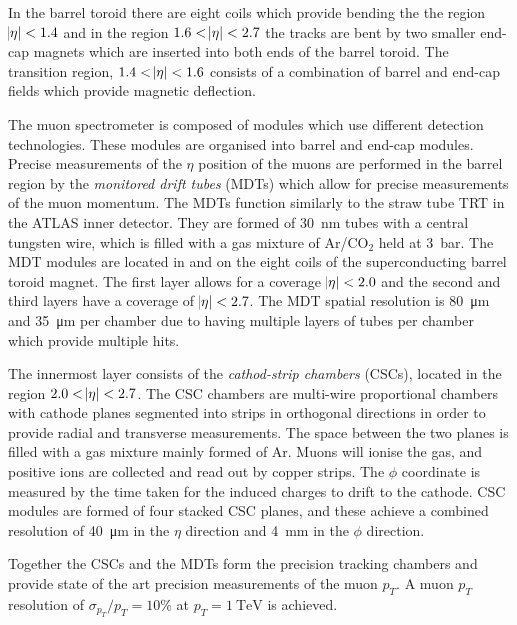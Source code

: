 In the barrel toroid there are eight coils which provide bending the the region $\abs{\eta} < 1.4$ and in the region $1.6 < \abs{\eta} < 2.7$ the tracks are bent by two smaller end-cap magnets which are inserted into both ends of the barrel toroid. The transition region, $1.4 < \abs{\eta} < 1.6$ consists of a combination of barrel and end-cap fields which provide magnetic deflection. 

The muon spectrometer is composed of modules which use different detection technologies. These modules are organised into barrel and end-cap modules. Precise measurements of the $\eta$ position of the muons are performed in the barrel region by the \emph{monitored drift tubes} (MDTs) which allow for precise measurements of the muon momentum. The MDTs function similarly to the straw tube TRT in the ATLAS inner detector. They are formed of \SI{30}{\nano\meter} tubes with a central tungsten wire, which is filled with a gas mixture of Ar/CO$_2$ held at \SI{3}{\bar}. The MDT modules are located in and on the eight coils of the superconducting barrel toroid magnet. The first layer allows for a coverage $\abs{\eta} < 2.0$ and the second and third layers have a coverage of $\abs{\eta} < 2.7$. The MDT spatial resolution is \SI{80}{\micro\meter} and \SI{35}{\micro\meter} per chamber due to having multiple layers of tubes per chamber which provide multiple hits. 

The innermost layer consists of the \emph{cathod-strip chambers} (CSCs), located in the region $2.0 < \abs{\eta} < 2.7$. The CSC chambers are multi-wire proportional chambers with cathode planes segmented into strips in orthogonal directions in order to provide radial and transverse measurements. The space between the two planes is filled with a gas mixture mainly formed of Ar. Muons will ionise the gas, and positive ions are collected and read out by copper strips. The $\phi$ coordinate is measured by the time taken for the induced charges to drift to the cathode. CSC modules are formed of four stacked CSC planes, and these achieve a combined resolution of \SI{40}{\micro\meter} in the $\eta$ direction and \SI{4}{\milli\meter} in the $\phi$ direction.

Together the CSCs and the MDTs form the precision tracking chambers and provide state of the art precision measurements of the muon $p_{T}$. A muon $p_{T}$ resolution of $\sigma_{p_{T}}/p_{T} = 10 \% $ at  $p_{T} = \SI{1}{\tera\electronvolt}$ is achieved. 

